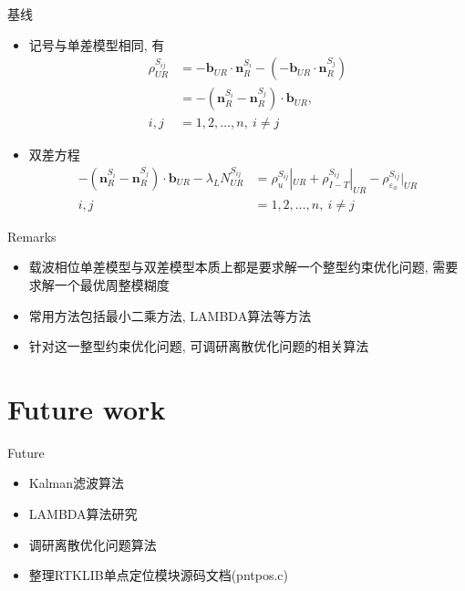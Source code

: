 \begin{frame}{基线}
    \begin{itemize}
        \item 记号与单差模型相同, 有
        \begin{align*}
            \rho _ { UR } ^ { S _ {ij} } &= - \mathbf b _ { UR } \cdot \mathbf n _ R ^ { S _ i }
            - \left( - \mathbf b _ { UR } \cdot \mathbf n _ R ^ { S _ j } \right) \\
            &= - \left( \mathbf n _ R ^ { S _ i }
            -\mathbf n _ R ^ { S _ j } \right) \cdot \mathbf b _ { UR }, \\
            i, j &= 1, 2, \ldots, n, \ i \ne j
        \end{align*}
        \item 双差方程
        \begin{align*}
            - \left( \mathbf n _ R ^ { S _ i }
            -\mathbf n _ R ^ { S _ j } \right) \cdot \mathbf b _ { UR }
            - \lambda _ L N _ { UR } ^ { S _ {ij} } &=
            \rho _ u ^ { S _ {ij} } | _ { U R }
            + \rho _ { I - T } ^ { S _ {ij} } | _ { UR } 
            - \rho _ { \varepsilon _ \phi } ^ { S _ {ij} } | _ { UR } \\
            i, j &= 1, 2, \ldots, n, \ i \ne j
        \end{align*}
    \end{itemize}
\end{frame}

\begin{frame}{Remarks}
    \begin{itemize}
        \item 载波相位单差模型与双差模型本质上都是要求解一个整型约束优化问题,
        需要求解一个最优周整模糊度
        \item 常用方法包括最小二乘方法, LAMBDA算法等方法
        \item 针对这一整型约束优化问题, 可调研离散优化问题的相关算法
    \end{itemize}
\end{frame}

\section{Future work}
\begin{frame}{Future}
    \begin{itemize}
        \item Kalman滤波算法
        \item LAMBDA算法研究
        \item 调研离散优化问题算法
        \item 整理RTKLIB单点定位模块源码文档(pntpos.c)
    \end{itemize}
\end{frame}